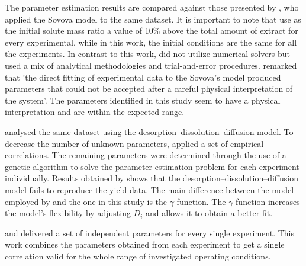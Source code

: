 \documentclass[../Supercritical_fluid_extraction_of_essential_oil_from_chamomile.tex]{subfiles}
\begin{document}
	
	
	The parameter estimation results are compared against those presented by \citet{Povh2001}, who applied the Sovova model to the same dataset. It is important to note that \citet{Povh2001} use as the initial solute mass ratio a value of 10\% above the total amount of extract for every experimental, while in this work, the initial conditions are the same for all the experiments. In contrast to this work, \citet{Povh2001} did not utilize numerical solvers but used a mix of analytical methodologies and trial-and-error procedures. \citet{Povh2001} remarked that 'the direct fitting of experimental data to the Sovova's model produced parameters that could not be accepted after a careful physical interpretation of the system'. The parameters identified in this study seem to have a physical interpretation and are within the expected range.
	
	\citet{Rahimi2011} analysed the same dataset using the desorption–dissolution–diffusion model. To decrease the number of unknown parameters, \citet{Rahimi2011} applied a set of empirical correlations. The remaining parameters were determined through the use of a genetic algorithm to solve the parameter estimation problem for each experiment individually. Results obtained by \citet{Rahimi2011} shows that the desorption–dissolution–diffusion model fails to reproduce the yield data. The main difference between the model employed by \citet{Rahimi2011} and the one in this study is the $\gamma$-function. The $\gamma$-function increases the model's flexibility by adjusting $D_i$ and allows it to obtain a better fit.
	
	\citet{Povh2001} and \citet{Rahimi2011} delivered a set of independent parameters for every single experiment. This work combines the parameters obtained from each experiment to get a single correlation valid for the whole range of investigated operating conditions.
	
\end{document}

